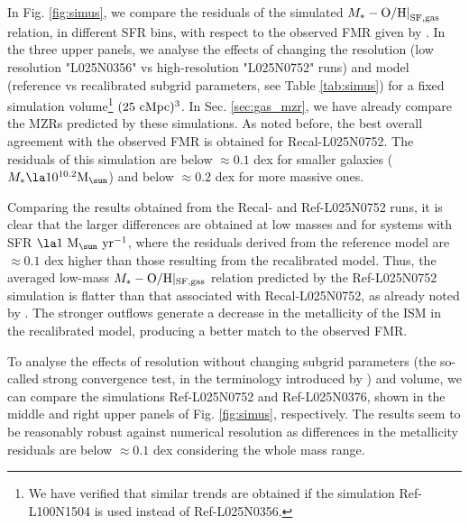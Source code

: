 \documentclass[useAMS,usenatbib]{mn2e}
\begin{document}
In Fig. \ref{fig:simus}, we compare the residuals of the simulated
$M_* - {\rm O/H|}_{\rm SF,gas}$ relation, in different SFR bins, with respect to the observed FMR given by 
\citet[][see shaded surface in Fig. \ref{fig:FMR}]{mannucci2010}.
In the three upper panels, we analyse the effects of changing the resolution (low resolution
"L025N0356" vs high-resolution "L025N0752" runs)
and model (reference vs recalibrated subgrid parameters, see Table \ref{tab:simus}) for a fixed simulation volume\footnote{
We have verified that similar trends are obtained if the simulation Ref-L100N1504 is used instead of
Ref-L025N0356.} 
$(25 \ {\rm cMpc})^3$.
In Sec. \ref{sec:gas_mzr}, we have already 
compare the MZRs predicted by these simulations.
As noted before, the best overall agreement with the observed FMR is obtained for 
Recal-L025N0752.  
The residuals of this simulation are below $\approx 0.1$ dex
for smaller galaxies ($M_* \la 10^{10.2} {\rm M}_{\sun}$) and below $\approx 0.2$ dex for more massive ones.

Comparing the results obtained from the Recal- and Ref-L025N0752 runs, 
it is clear that the larger differences are obtained at low masses and 
for systems with SFR $\la 1 \ {\rm M}_{\sun} \ {\rm yr}^{-1}$, where the residuals derived from
the reference model are $\approx 0.1$ dex higher than those resulting from the recalibrated model.  
Thus, the averaged low-mass $M_* - {\rm O/H}|_{\rm SF,gas}$ relation predicted by the Ref-L025N0752 simulation is flatter
than that associated with Recal-L025N0752, as already noted by \citet{schaye2015}.
The stronger outflows generate a decrease in the metallicity of the ISM in the recalibrated model,
producing a better match to the observed FMR.

To analyse the effects of resolution without changing subgrid parameters (the so-called strong convergence test, in the terminology introduced by \citealt{schaye2015}) and volume, we can compare
the simulations Ref-L025N0752 and Ref-L025N0376, shown in the middle and right upper panels 
of Fig. \ref{fig:simus}, respectively.  
The results seem to be reasonably robust against numerical
resolution as differences in the metallicity residuals 
are below $\approx 0.1$ dex considering the whole mass range.
\end{document}
